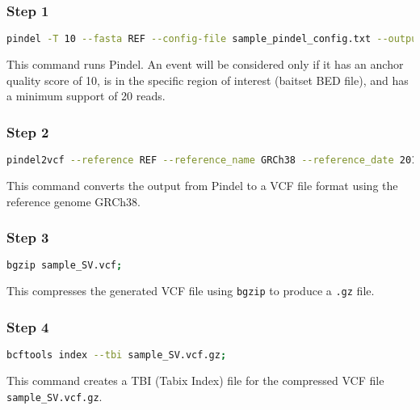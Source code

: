 \subsubsection*{Step 1}

\begin{lstlisting}[breaklines=true, language=bash]
    pindel -T 10 --fasta REF --config-file sample_pindel_config.txt --output-prefix sample_SV --anchor_quality 10 --include path/to/CORE_covered_regions.bed --minimum_support_for_event 20 --name_of_logfile log_dir/011-SVCalling_rule_sample.log;
\end{lstlisting}

This command runs Pindel. An event will be considered only if it has an anchor quality score of 10, is in the specific region of interest (baitset BED file), and has a minimum support of 20 reads. 

\subsubsection*{Step 2}

\begin{lstlisting}[breaklines=true, language=bash]
    pindel2vcf --reference REF --reference_name GRCh38 --reference_date 20160222 --pindel_output_root sample_SV;
\end{lstlisting}

This command converts the output from Pindel to a VCF file format using the reference genome GRCh38.

\subsubsection*{Step 3}

\begin{lstlisting}[breaklines=true, language=bash]
    bgzip sample_SV.vcf;
\end{lstlisting}

This compresses the generated VCF file using \texttt{bgzip} to produce a \texttt{.gz} file.

\subsubsection*{Step 4}

\begin{lstlisting}[breaklines=true, language=bash]
    bcftools index --tbi sample_SV.vcf.gz;
\end{lstlisting}

This command creates a TBI (Tabix Index) file for the compressed VCF file \texttt{sample\_SV.vcf.gz}.

